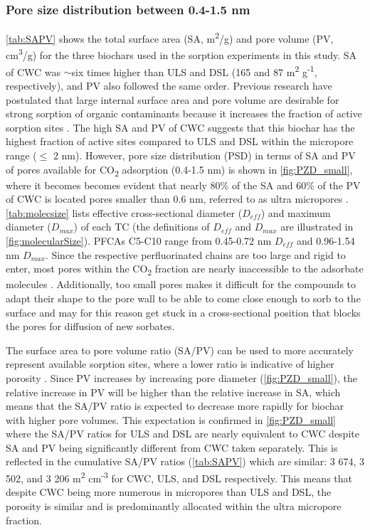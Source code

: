 \subsubsection{Pore size distribution between 0.4-1.5 nm}
\cref{tab:SAPV} shows the total surface area (SA, m\textsuperscript{2}/g) and pore volume (PV, cm\textsuperscript{3}/g) for the three biochars used in the sorption experiments in this study. SA of CWC was $\sim$six times higher than ULS and DSL (165 and 87  m\textsuperscript{2} g\textsuperscript{-1}, respectively), and PV also followed the same order. Previous research have postulated that large internal surface area and pore volume are desirable for strong sorption of organic contaminants because it increases the fraction of active sorption sites \citep{ahmed2020per,Hale2016}. The high SA and PV of CWC suggests that this biochar has the highest fraction of active sites compared to ULS and DSL within the micropore range ($\le$ 2 nm). However, pore size distribution (PSD) in terms of SA and PV of pores available for CO\textsubscript{2} adsorption (0.4-1.5 nm) is shown in \cref{fig:PZD_small}, where it becomes becomes evident that nearly 80\% of the SA and 60\% of the PV of CWC is located pores smaller than 0.6 nm, referred to as ultra micropores \citep{bardestani2019experimental}. \cref{tab:molecsize} lists effective cross-sectional diameter ($D_{eff}$) and maximum diameter ($D_{max}$) of each TC (the definitions of $D_{eff}$ and $D_{max}$ are illustrated in \cref{fig:molecularSize}). PFCAs C5-C10 range from 0.45-0.72 nm $D_{eff}$ and 0.96-1.54 nm $D_{max}$. Since the respective perfluorinated chains are too large and rigid to enter, most pores within the CO\textsubscript{2} fraction are nearly inaccessible to the adsorbate molecules \citep{yu2009sorption}. Additionally, too small pores makes it difficult for the compounds to adapt their shape to the pore wall to be able to come close enough to sorb to the surface and may for this reason get stuck in a cross-sectional position that blocks the pores for diffusion of new sorbates. 

The surface area to pore volume ratio (SA/PV) can be used to more accurately represent available sorption sites, where a lower ratio is indicative of higher porosity \citep{presser2011SAPV}. Since PV increases by increasing pore diameter (\cref{fig:PZD_small}), the relative increase in PV will be higher than the relative increase in SA, which means that the SA/PV ratio is expected to decrease more rapidly for biochar with higher pore volumes. This expectation is confirmed in \cref{fig:PZD_small} where the SA/PV ratios for ULS and DSL are nearly equivalent to CWC despite SA and PV being significantly different from CWC taken separately. This is reflected in the cumulative SA/PV ratios (\cref{tab:SAPV}) which are similar: 3 674, 3 502, and 3 206 m\textsuperscript{2} cm\textsuperscript{-3} for CWC, ULS, and DSL respectively. This means that despite CWC being more numerous in micropores than ULS and DSL, the porosity is similar and is predominantly allocated within the ultra micropore fraction.


